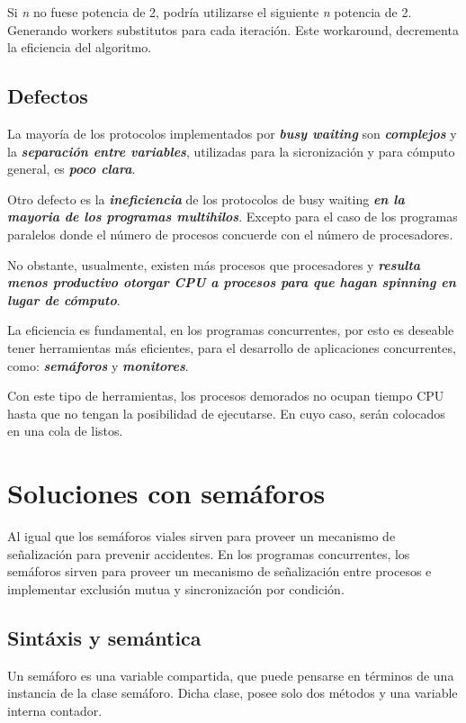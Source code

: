 \documentclass[a4paper, 10pt]{report}
\begin{document}
Si \emph{n} no fuese potencia de 2, podría utilizarse el siguiente \emph{n} potencia de 2. Generando workers substitutos para cada iteración. Este workaround, decrementa la eficiencia del algoritmo.

\section{Defectos}

La mayoría de los protocolos implementados por \textbf{\emph{busy waiting}} son \textbf{\emph{complejos}} y la \textbf{\emph{separación entre variables}}, utilizadas para la sicronización y para cómputo general, es \textbf{\emph{poco clara}}.

Otro defecto es la \textbf{\emph{ineficiencia}} de los protocolos de busy waiting \textbf{\emph{en la mayoria de los programas multihilos}}. Excepto para el caso de los programas paralelos donde el número de procesos concuerde con el número de procesadores. 

No obstante, usualmente, existen más procesos que procesadores y \textbf{\emph{resulta menos productivo otorgar CPU a procesos para que hagan spinning en lugar de cómputo}}.

La eficiencia es fundamental, en los programas concurrentes, por esto es deseable tener herramientas más eficientes, para el desarrollo de aplicaciones concurrentes, como: \textbf{\emph{semáforos}} y \textbf{\emph{monitores}}. 

Con este tipo de herramientas, los procesos demorados no ocupan tiempo CPU hasta que no tengan la posibilidad de ejecutarse. En cuyo caso, serán colocados en una cola de listos.

\chapter{Soluciones con semáforos}
\vspace*{-10mm}

Al igual que los semáforos viales sirven para proveer un mecanismo de señalización para prevenir accidentes. En los programas concurrentes, los semáforos sirven para proveer un mecanismo de señalización entre procesos e implementar exclusión mutua y sincronización por condición.

\section{Sintáxis y semántica}

Un semáforo es una variable compartida, que puede pensarse en términos de una instancia de la clase semáforo. Dicha clase, posee solo dos métodos y una variable interna contador. 
\end{document}
